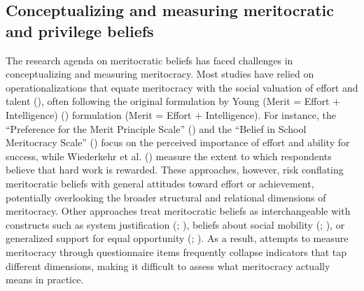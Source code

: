 \documentclass[
  13pt,
]{article}
\begin{document}
\subsection{Conceptualizing and measuring meritocratic and privilege
beliefs}\label{conceptualizing-and-measuring-meritocratic-and-privilege-beliefs}

The research agenda on meritocratic beliefs has faced challenges in
conceptualizing and measuring meritocracy. Most studies have relied on
operationalizations that equate meritocracy with the social valuation of
effort and talent (), often following the original formulation by Young (Merit =
Effort + Intelligence) ()
formulation (Merit = Effort + Intelligence). For instance, the
``Preference for the Merit Principle Scale''
() and the
``Belief in School Meritocracy Scale''
() focus on the
perceived importance of effort and ability for success, while Wiederkehr
et al. () measure the extent
to which respondents believe that hard work is rewarded. These
approaches, however, risk conflating meritocratic beliefs with general
attitudes toward effort or achievement, potentially overlooking the
broader structural and relational dimensions of meritocracy. Other
approaches treat meritocratic beliefs as interchangeable with constructs
such as system justification (; ),
beliefs about social mobility (; ),
or generalized support for equal opportunity
(;
). As a result,
attempts to measure meritocracy through questionnaire items frequently
collapse indicators that tap different dimensions, making it difficult
to assess what meritocracy actually means in practice.
\end{document}
